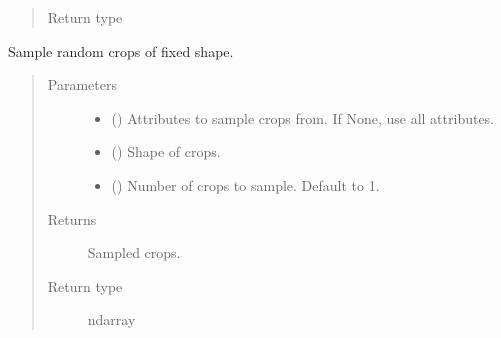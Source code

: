 \documentclass[letterpaper,10pt,english]{sphinxmanual}
\begin{document}
\begin{fulllineitems}
\begin{fulllineitems}
\begin{quote}
\begin{description}
\item[{Return type}] \leavevmode
{\hyperref[\detokenize{api/base_classes:geology.src.base_spatial.SpatialComponent}]{}}

\end{description}\end{quote}

\end{fulllineitems}


\begin{fulllineitems}
\label{\detokenize{api/rock:geology.src.Rock.sample_crops}}
Sample random crops of fixed shape.
\begin{quote}\begin{description}
\item[{Parameters}] \leavevmode\begin{itemize}
\item {} 
 (\sphinxstyleliteralemphasis{\sphinxupquote{, }}) \textendash{} Attributes to sample crops from. If None, use all attributes.

\item {} 
 () \textendash{} Shape of crops.

\item {} 
 (\sphinxstyleliteralemphasis{\sphinxupquote{, }}) \textendash{} Number of crops to sample. Default to 1.

\end{itemize}

\item[{Returns}] \leavevmode
{} \textendash{} Sampled crops.

\item[{Return type}] \leavevmode
ndarray


\end{description}
\end{quote}
\end{fulllineitems}
\end{fulllineitems}
\end{document}
